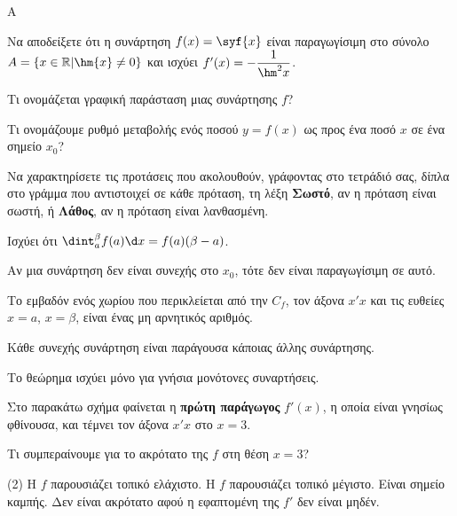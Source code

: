 \begin{thema}{A}
\begin{erwthma}
    \item Να αποδείξετε ότι η συνάρτηση $ f(x)=\syf{x} $ είναι παραγωγίσιμη στο σύνολο $ A=\{x\in\mathbb{R}|\hm{x}\neq 0\} $ και ισχύει $ f'(x)=-\dfrac{1}{\hm^2{x}} $.
    \item Τι ονομάζεται γραφική παράσταση μιας συνάρτησης $f$?
    \item Τι ονομάζουμε ρυθμό μεταβολής ενός ποσού $y=f(x)$ ως προς ένα ποσό $x$ σε ένα σημείο $x_0$?
    \item Να χαρακτηρίσετε τις προτάσεις που ακολουθούν, γράφοντας στο τετράδιό σας, δίπλα στο γράμμα που αντιστοιχεί σε κάθε πρόταση, τη λέξη \textbf{Σωστό}, αν η πρόταση είναι σωστή, ή \textbf{Λάθος}, αν η πρόταση είναι λανθασμένη.
    \begin{alist}
        \item Ισχύει ότι $\dint_{a}^{\beta} f(a) \d x = f(a)(\beta - a)$.
        \item Αν μια συνάρτηση δεν είναι συνεχής στο $x_0$, τότε δεν είναι παραγωγίσιμη σε αυτό.
        \item Το εμβαδόν ενός χωρίου που περικλείεται από την $C_f$, τον άξονα $x'x$ και τις ευθείες $x=a$, $x=\beta$, είναι ένας μη αρνητικός αριθμός.
        \item Κάθε συνεχής συνάρτηση είναι παράγουσα κάποιας άλλης συνάρτησης.
        \item Το θεώρημα  ισχύει μόνο για γνήσια μονότονες συναρτήσεις.
    \end{alist}
    \item Στο παρακάτω σχήμα φαίνεται η \textbf{πρώτη παράγωγος} $f'(x)$, η οποία είναι γνησίως φθίνουσα, και τέμνει τον άξονα $x'x$ στο $x=3$.
    \begin{center}
    \end{center}
    Τι συμπεραίνουμε για το ακρότατο της $f$ στη θέση $x=3$?
    \begin{tasks}[label=\let\textdexiakeraia\relax\alph*.](2)
        \task H $f$ παρουσιάζει τοπικό ελάχιστο.
        \task H $f$ παρουσιάζει τοπικό μέγιστο.
        \task Είναι σημείο καμπής.
        \task Δεν είναι ακρότατο αφού η εφαπτομένη της $f'$ δεν είναι μηδέν.
    \end{tasks}
\end{erwthma}
\end{thema}


